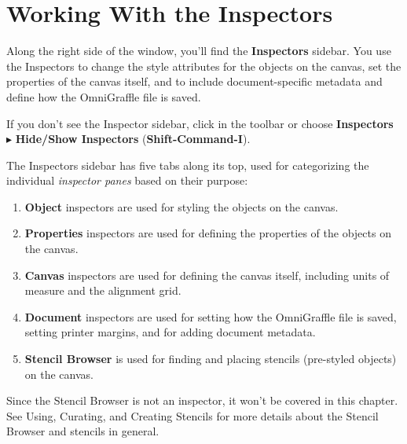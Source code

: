 \documentclass[../main.tex]{subfiles}
\begin{document}
\chapter{Working With the Inspectors}

Along the right side of the window, you'll find the \textbf{Inspectors} sidebar. You use the
Inspectors to change the style attributes for the objects on the canvas, set the properties of
the canvas itself, and to include document-specific metadata and define how the OmniGraffle
file is saved.

\begin{ogtip}
  If you don't see the Inspector sidebar, click  in
  the toolbar or choose \textbf{Inspectors} $\blacktriangleright$ \textbf{Hide/Show Inspectors}
  (\textbf{Shift-Command-I}).
\end{ogtip}

The Inspectors sidebar has five tabs along its top, used for categorizing the individual
\textit{inspector panes} based on their purpose:


\begin{enumerate}
  \item \textbf{Object} inspectors are used for styling the objects on the canvas.
  \item \textbf{Properties} inspectors are used for defining the properties of the objects on
    the canvas.
  \item \textbf{Canvas} inspectors are used for defining the canvas itself, including units of
    measure and the alignment grid.
  \item \textbf{Document} inspectors are used for setting how the OmniGraffle file is saved,
    setting printer margins, and for adding document metadata.
  \item \textbf{Stencil Browser} is used for finding and placing stencils (pre-styled objects)
    on the canvas.
\end{enumerate}

\begin{ognote}
  Since the Stencil Browser is not an inspector, it won't be covered in this chapter. See Using,
  Curating, and Creating Stencils for more details about the Stencil Browser and stencils in
  general.
\end{ognote}
\end{document}
